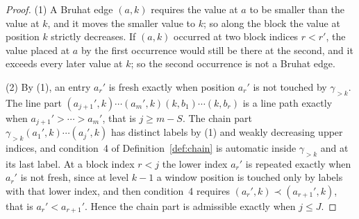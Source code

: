 \documentclass[11pt]{article}
\begin{document}
\begin{proof}
(1) A Bruhat edge $(a,k)$ requires the value at $a$ to be smaller
than the value at $k$, and it moves the smaller value to $k$; so along
the block the value at position $k$ strictly decreases. If $(a,k)$
occurred at two block indices $r<r'$, the value placed at $a$ by the
first occurrence would still be there at the second, and it exceeds
every later value at $k$; so the second occurrence is not a Bruhat
edge.

(2) By (1), an entry $a_r'$ is fresh exactly when position $a_r'$ is
not touched by $\gamma_{>k}$. The line part $(a_{j+1}',k)\cdots(a_m',k)(k,b_1)\cdots(k,b_r)$ is a
line path exactly when $a_{j+1}'>\cdots>a_m'$, that is $j\geq m-S$. The
chain part $\gamma_{>k}(a_1',k)\cdots(a_j',k)$ has distinct labels by
(1) and weakly decreasing upper indices, and condition~4 of
Definition~\ref{def:chain} is automatic inside $\gamma_{>k}$ and at
its last label. At a block index $r<j$ the lower index $a_r'$ is
repeated exactly when $a_r'$ is not fresh, since at level $k-1$ a
window position is touched only by labels with that lower index, and
then condition~4 requires $(a_r',k)\prec(a_{r+1}',k)$, that is
$a_r'<a_{r+1}'$. Hence the chain part is admissible exactly when
$j\leq J$.


\end{proof}
\end{document}
